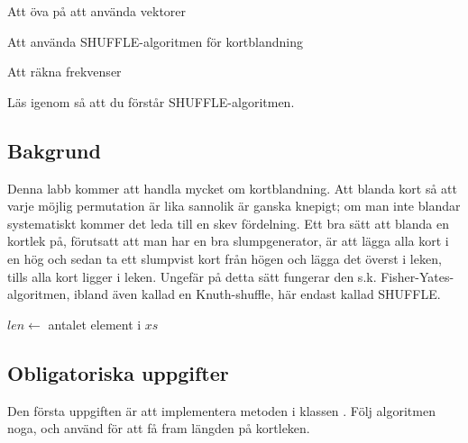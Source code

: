 

\Lab{\LabWeekFIVE}

\begin{Goals}
\item Att öva på att använda vektorer
\item Att använda SHUFFLE-algoritmen för kortblandning
\item Att räkna frekvenser
\end{Goals}

\begin{Preparations}
\item Läs igenom så att du förstår SHUFFLE-algoritmen.
\end{Preparations}

\subsection{Bakgrund}

Denna labb kommer att handla mycket om kortblandning. Att blanda kort så att varje möjlig permutation är lika sannolik är ganska knepigt; om man inte blandar systematiskt kommer det leda till en skev fördelning. Ett bra sätt att blanda en kortlek på, förutsatt att man har en bra slumpgenerator, är att lägga alla kort i en hög och sedan ta ett slumpvist kort från högen och lägga det överst i leken, tills alla kort ligger i leken. Ungefär på detta sätt fungerar den s.k. Fisher-Yates-algoritmen, ibland även kallad en Knuth-shuffle, här endast kallad SHUFFLE.

\begin{algorithm}[H]
 $len \leftarrow$ antalet element i $xs$ \\
\end{algorithm}

\subsection{Obligatoriska uppgifter}

\Task Den första uppgiften är att implementera metoden  i klassen . Följ algoritmen noga, och använd  för att få fram längden på kortleken. 

